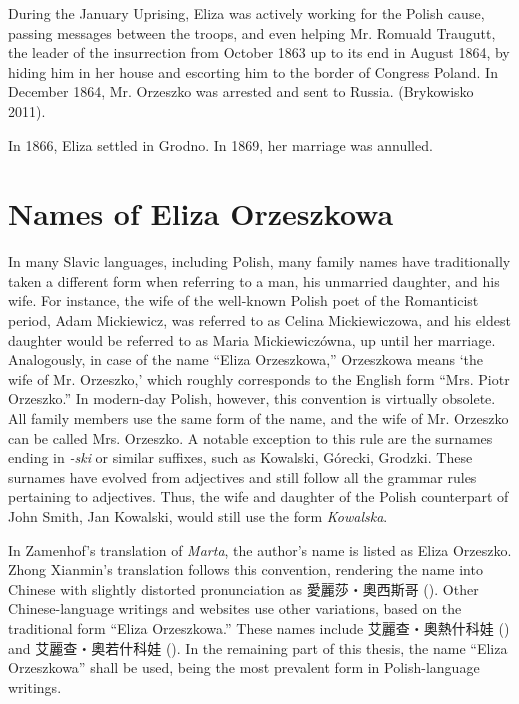 During the January Uprising, Eliza was actively working for the Polish cause, passing messages between the troops, and even helping Mr. Romuald Traugutt, the leader of the insurrection from October 1863 up to its end in August 1864, by hiding him in her house and escorting him to the border of Congress Poland.
In December 1864, Mr. Orzeszko was arrested and sent to Russia.
(Brykowisko 2011).

In 1866, Eliza settled in Grodno. In 1869, her marriage was annulled.

\section{Names of Eliza Orzeszkowa}

In many Slavic languages, including Polish, many family names have traditionally taken a different form when referring to a man, his unmarried daughter, and his wife.
For instance, the wife of the well-known Polish poet of the Romanticist period, Adam Mickiewicz, was referred to as Celina Mickiewiczowa, and his eldest daughter would be referred to as Maria Mickiewiczówna, up until her marriage.
Analogously, in case of the name ``Eliza Orzeszkowa,'' Orzeszkowa means `the wife of Mr. Orzeszko,' which roughly corresponds to the English form ``Mrs. Piotr Orzeszko.''
In modern-day Polish, however, this convention is virtually obsolete.
All family members use the same form of the name, and the wife of Mr. Orzeszko can be called Mrs. Orzeszko.
A notable exception to this rule are the surnames ending in \textit{-ski} or similar suffixes, such as Kowalski, Górecki, Grodzki.
These surnames have evolved from adjectives and still follow all the grammar rules pertaining to adjectives.
Thus, the wife and daughter of the Polish counterpart of John Smith, Jan Kowalski, would still use the form \textit{Kowalska}. 

In Zamenhof's translation of \textit{Marta}, the author's name is listed as Eliza Orzeszko.
Zhong Xianmin's translation follows this convention, rendering the name into Chinese with slightly distorted pronunciation as 愛麗莎・奧西斯哥 ().
Other Chinese-language writings and websites use other variations, based on the traditional form ``Eliza Orzeszkowa.''
These names include 艾麗查・奧熱什科娃 () and 艾麗查・奧若什科娃 (). In the remaining part of this thesis, the name ``Eliza Orzeszkowa'' shall be used, being the most prevalent form in Polish-language writings.

